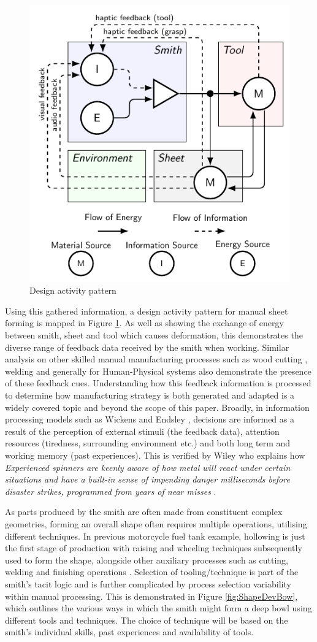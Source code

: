 \begin{figure}[h]
  \centering
  \includegraphics[width=0.5\linewidth]{Diagrams/DAP4.pdf}  
  \caption{Design activity pattern}
  \label{fig:DAP}
\end{figure}

Using this gathered information, a design activity pattern for manual sheet forming is mapped in Figure \ref{fig:DAP}. As well as showing the exchange of energy between smith, sheet and tool which causes deformation, this demonstrates the diverse range of feedback data received by the smith when working. Similar analysis on other skilled manual manufacturing processes such as wood cutting \citep{Roth1981FoundationDesign}, welding \citep{Zhang2012ModelingPrinciples} and generally for Human-Physical systems \cite{Zhou2018TowardManufacturing} also demonstrate the presence of these feedback cues. Understanding how this feedback information is processed to determine how manufacturing strategy is both generated and adapted is a widely covered topic and beyond the scope of this paper. Broadly, in information processing models such as Wickens \citep{Wickens2015EngineeringPerformance} and Endsley \citep{Endsley1995TowardSystems}, decisions are informed as a result of the perception of external stimuli (the feedback data), attention resources (tiredness, surrounding environment etc.) and both long term and working memory (past experiences). This is verified by Wiley who explains how \textit{Experienced spinners are keenly aware of how metal will react under certain situations and have a built-in sense of impending danger milliseconds before disaster strikes, programmed from years of near misses} \citep{Wiley2004TheHand-spinning}.  

As parts produced by the smith are often made from constituent complex geometries, forming an overall shape often requires multiple operations, utilising different techniques. In previous motorcycle fuel tank example, hollowing is just the first stage of production with raising and wheeling techniques subsequently used to form the shape, alongside other auxiliary processes such as cutting, welding and finishing operations \citep{Barr2013ProfessionalFabrication}. Selection of tooling/technique is part of the smith's tacit logic and is further complicated by process selection variability within manual processing. This is demonstrated in Figure \ref{fig:ShapeDevBow}, which outlines the various ways in which the smith might form a deep bowl using different tools and techniques. The choice of technique will be based on the smith’s individual skills, past experiences and availability of tools. 

